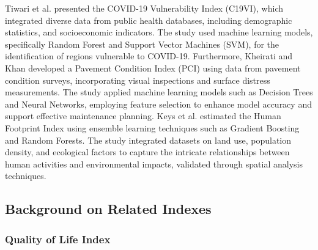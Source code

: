  Tiwari et al.  \cite{Abtahi} presented the COVID-19 Vulnerability Index (C19VI), which integrated diverse data from public health databases, including demographic statistics, and socioeconomic indicators. The study used machine learning models, specifically Random Forest and Support Vector Machines (SVM), for the identification of regions vulnerable to COVID-19. Furthermore,   Kheirati and Khan \cite{Khan_Ali} developed a Pavement Condition Index (PCI) using data from pavement condition surveys, incorporating visual inspections and surface distress measurements. The study applied machine learning models such as Decision Trees and Neural Networks, employing feature selection to enhance model accuracy and support effective maintenance planning. Keys et al. \cite{Isa} estimated the Human Footprint Index using ensemble learning techniques such as Gradient Boosting and Random Forests. The study integrated datasets on land use, population density, and ecological factors to capture the intricate relationships between human activities and environmental impacts, validated through spatial analysis techniques. 



\subsection{Background on Related Indexes}

\subsubsection{Quality of Life Index}


